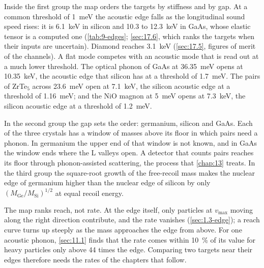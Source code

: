 Inside the first group the map orders the targets by stiffness and by gap. At a common threshold of \SI{1}{meV} the acoustic edge falls as the longitudinal sound speed rises: it is \SI{6.1}{keV} in silicon and 10.3 to \SI{12.3}{keV} in GaAs, whose elastic tensor is a computed one (\cref{tab:9-edges}; \cref{sec:17.6}, which ranks the targets when their inputs are uncertain). Diamond reaches \SI{3.1}{keV} (\cref{sec:17.5}, figures of merit of the channels). A flat mode competes with an acoustic mode that is read out at a much lower threshold. The optical phonon of GaAs at \SI{36.35}{meV} opens at \SI{10.35}{keV}, the acoustic edge that silicon has at a threshold of \SI{1.7}{meV}. The pairs of ZrTe$_5$ across \SI{23.6}{meV} open at \SI{7.1}{keV}, the silicon acoustic edge at a threshold of \SI{1.16}{meV}; and the NiO magnon at \SI{5}{meV} opens at \SI{7.3}{keV}, the silicon acoustic edge at a threshold of \SI{1.2}{meV}.

In the second group the gap sets the order: germanium, silicon and GaAs. Each of the three crystals has a window of masses above its floor in which pairs need a phonon. In germanium the upper end of that window is not known, and in GaAs the window ends where the L valleys open. A detector that counts pairs reaches its floor through phonon-assisted scattering, the process that \cref{chap:13} treats. In the third group the square-root growth of the free-recoil mass makes the nuclear edge of germanium higher than the nuclear edge of silicon by only $(M_{\mathrm{Ge}}/M_{\mathrm{Si}})^{1/2}$ at equal recoil energy.

The map ranks reach, not rate. At the edge itself, only particles at $v_{\mathrm{max}}$ moving along the right direction contribute, and the rate vanishes (\cref{sec:1.3-edge}); a reach curve turns up steeply as the mass approaches the edge from above. For one acoustic phonon, \cref{sec:11.1} finds that the rate comes within \SI{10}{\percent} of its value for heavy particles only above 44 times the edge. Comparing two targets near their edges therefore needs the rates of the chapters that follow.


